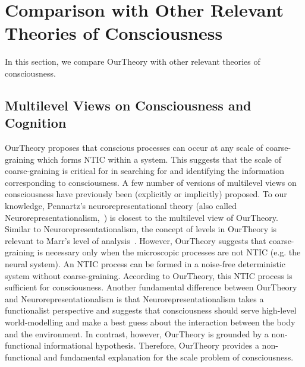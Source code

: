 \documentclass[utf8]{article}
\begin{document}
    \section{Comparison with Other Relevant Theories of Consciousness}\label{sec:Comparison with other theories}
    In this section, we compare \ac{OurTheory} with other relevant theories of consciousness.
	
	
        \subsection{Multilevel Views on Consciousness and Cognition}\label{sec:MultiLevelView}
    		\ac{OurTheory} proposes that conscious processes can occur at any scale of coarse-graining which forms NTIC within a system. This suggests that the scale of coarse-graining is critical for in searching for and identifying the information corresponding to consciousness. A few number of versions of multilevel views on consciousness have previously been (explicitly or implicitly) proposed. To our knowledge, Pennartz’s neurorepresentational theory (also called Neurorepresentationalism,~\citep{pennartz2018consciousness,pennartz2015brain}) is closest to the multilevel view of \ac{OurTheory}. Similar to Neurorepresentationalism, the concept of levels in \ac{OurTheory} is relevant to Marr's level of analysis~\citep{marr1982vision, pennartz2015brain, pennartz2018consciousness}. 
    		However, \ac{OurTheory} suggests that coarse-graining is necessary only when the microscopic processes are not NTIC (e.g. the neural system). An NTIC process can be formed in a noise-free deterministic system without coarse-graining. According to \ac{OurTheory}, this NTIC process is sufficient for consciousness. 
    		Another fundamental difference between \ac{OurTheory} and Neurorepresentationalism is that Neurorepresentationalism takes a functionalist perspective and suggests that consciousness should serve high-level world-modelling and make a best guess about the interaction between the body and the environment. 
    		In contrast, however, \ac{OurTheory} is grounded by a non-functional informational hypothesis. Therefore, \ac{OurTheory} provides a non-functional and fundamental explanation for the scale problem of consciousness. 
    		
\end{document}
